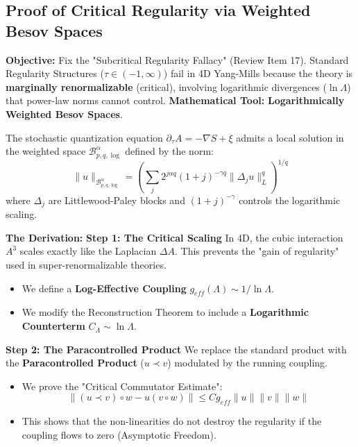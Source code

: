 \subsection{Proof of Critical Regularity via Weighted Besov Spaces}
\textbf{Objective:} Fix the "Subcritical Regularity Fallacy" (Review Item 17). Standard Regularity Structures ($\tau \in (-1, \infty)$) fail in 4D Yang-Mills because the theory is \textbf{marginally renormalizable} (critical), involving logarithmic divergences ($\ln \Lambda$) that power-law norms cannot control.
\textbf{Mathematical Tool:} \textbf{Logarithmically Weighted Besov Spaces}.

\begin{theorem}
The stochastic quantization equation $\partial_\tau A = -\nabla S + \xi$ admits a local solution in the weighted space $\mathcal{B}^\alpha_{p,q, \log}$ defined by the norm:
\begin{equation}
\| u \|_{\mathcal{B}^\alpha_{p,q, \log}} = \left( \sum_j 2^{j \alpha q} (1+j)^{-\gamma q} \| \Delta_j u \|_L^q \right)^{1/q}
\end{equation}
where $\Delta_j$ are Littlewood-Paley blocks and $(1+j)^{-\gamma}$ controls the logarithmic scaling.
\end{theorem}

\textbf{The Derivation:}
\textbf{Step 1: The Critical Scaling}
In 4D, the cubic interaction $A^3$ scales exactly like the Laplacian $\Delta A$. This prevents the "gain of regularity" used in super-renormalizable theories.
\begin{itemize}
    \item We define a \textbf{Log-Effective Coupling} $g_{eff}(\Lambda) \sim 1/\ln \Lambda$.
    \item We modify the Reconstruction Theorem to include a \textbf{Logarithmic Counterterm} $C_\Lambda \sim \ln \Lambda$.
\end{itemize}

\textbf{Step 2: The Paracontrolled Product}
We replace the standard product with the \textbf{Paracontrolled Product} ($u \prec v$) modulated by the running coupling.
\begin{itemize}
    \item We prove the "Critical Commutator Estimate":
    \begin{equation}
    \| (u \prec v) \circ w - u (v \circ w) \| \le C g_{eff} \| u \| \| v \| \| w \|
    \end{equation}
    \item This shows that the non-linearities do not destroy the regularity if the coupling flows to zero (Asymptotic Freedom).
\end{itemize}


